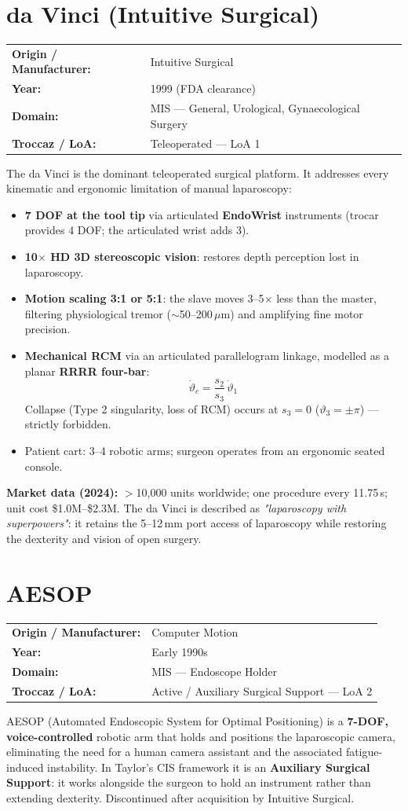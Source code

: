 \documentclass[11pt,a4paper,twoside]{report}
\makeatletter
\newcommand{\robotmeta}[4]{%
  \noindent\begin{tabular}{@{}ll@{}}
    \textbf{Origin / Manufacturer:} & #1 \\
    \textbf{Year:}                  & #2 \\
    \textbf{Domain:}                & #3 \\
    \textbf{Troccaz / LoA:}         & #4 \\
  \end{tabular}\par\smallskip\noindent}
\makeatother
\begin{document}
\section{da Vinci (Intuitive Surgical)}
\robotmeta{Intuitive Surgical}{1999 (FDA clearance)}{MIS — General, Urological, Gynaecological Surgery}{Teleoperated — LoA 1}
The da Vinci is the dominant teleoperated surgical platform. It addresses every kinematic and ergonomic limitation of manual laparoscopy:
\begin{itemize}
  \item \textbf{7 DOF at the tool tip} via articulated \textbf{EndoWrist} instruments (trocar provides 4 DOF; the articulated wrist adds 3).
  \item \textbf{10$\times$ HD 3D stereoscopic vision}: restores depth perception lost in laparoscopy.
  \item \textbf{Motion scaling 3:1 or 5:1}: the slave moves 3--5$\times$ less than the master, filtering physiological tremor ($\sim$50--200\,$\mu$m) and amplifying fine motor precision.
  \item \textbf{Mechanical RCM} via an articulated parallelogram linkage, modelled as a planar \textbf{RRRR four-bar}:
  \[ \dot{\vartheta}_c = \frac{s_2}{s_3}\,\dot{\vartheta}_1 \]
  Collapse (Type 2 singularity, loss of RCM) occurs at $s_3 = 0$ ($\vartheta_3 = \pm\pi$) — strictly forbidden.
  \item Patient cart: 3--4 robotic arms; surgeon operates from an ergonomic seated console.
\end{itemize}
\textbf{Market data (2024):} $>$10,000 units worldwide; one procedure every 11.75\,s; unit cost \$1.0M--\$2.3M. The da Vinci is described as \textit{"laparoscopy with superpowers"}: it retains the 5--12\,mm port access of laparoscopy while restoring the dexterity and vision of open surgery.

\section{AESOP}
\robotmeta{Computer Motion}{Early 1990s}{MIS — Endoscope Holder}{Active / Auxiliary Surgical Support — LoA 2}
AESOP (Automated Endoscopic System for Optimal Positioning) is a \textbf{7-DOF, voice-controlled} robotic arm that holds and positions the laparoscopic camera, eliminating the need for a human camera assistant and the associated fatigue-induced instability. In Taylor's CIS framework it is an \textbf{Auxiliary Surgical Support}: it works alongside the surgeon to hold an instrument rather than extending dexterity. Discontinued after acquisition by Intuitive Surgical.
\end{document}
